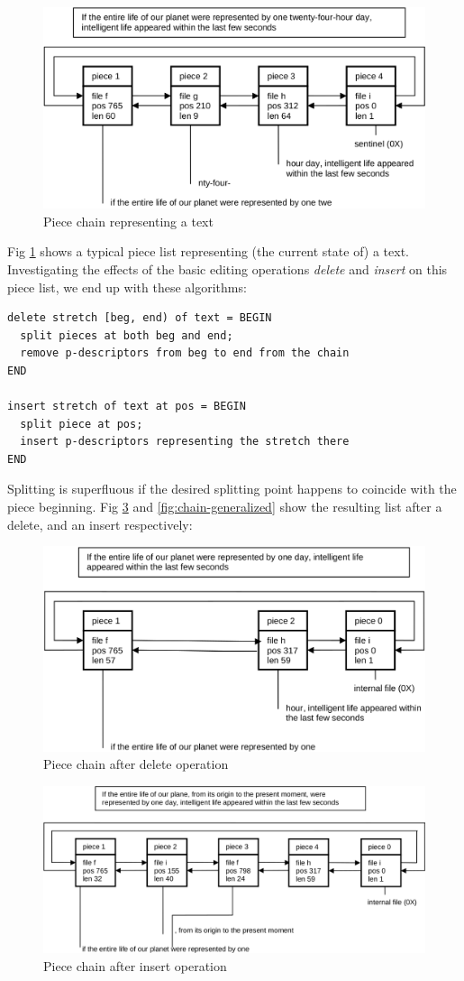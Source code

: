 \begin{figure}[h!]
  \centering
  \includegraphics[width=.8\textwidth]{i/d}
  \caption{Piece chain representing a text}
  \label{fig:chain}
\end{figure}
Fig \ref{fig:chain} shows a typical piece list representing (the current state of) a text.
Investigating the effects of the basic editing operations \emph{delete} and \emph{insert}
on this piece list, we end up with these algorithms:
\begin{verbatim}
delete stretch [beg, end) of text = BEGIN
  split pieces at both beg and end;
  remove p-descriptors from beg to end from the chain
END

insert stretch of text at pos = BEGIN
  split piece at pos;
  insert p-descriptors representing the stretch there
END
\end{verbatim}
Splitting is superfluous if the desired splitting point happens to coincide with
the piece beginning.  Fig \ref{fig:chain-after-insert} and \ref{fig:chain-generalized}
show the resulting list after a delete, and an insert respectively:
\begin{figure}[h!]
  \centering
  \includegraphics[width=.8\textwidth]{i/e}
  \caption{Piece chain after delete operation}
  \label{fig:chain-after-delete}
\end{figure}
\begin{figure}[h!]
  \centering
  \includegraphics[width=.8\textwidth]{i/f}
  \caption{Piece chain after insert operation}
  \label{fig:chain-after-insert}
\end{figure}

